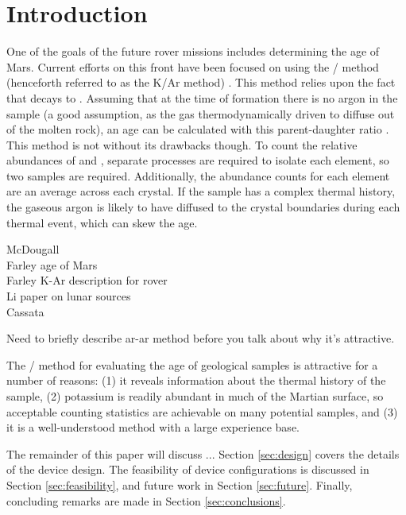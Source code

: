 \documentclass{mc2015}
\begin{document}
\section{Introduction}

One of the goals of the future rover missions includes determining the age of Mars. Current efforts on this front have been focused on using the / method (henceforth referred to as the K/Ar method) \cite{farley_situ_2014,farley_double-spike_2013,cassata_situ_2014}. This method relies upon the fact that  decays to . Assuming that at the time of formation there is no argon in the sample (a good assumption, as the gas thermodynamically driven to diffuse out of the molten rock), an age can be calculated with this parent-daughter ratio \cite{mcdougall_geochronology_1999}. This method is not without its drawbacks though. To count the relative abundances of  and , separate processes are required to isolate each element, so two samples are required. Additionally, the abundance counts for each element are an average across each crystal.
 If the sample has a complex thermal history, the gaseous argon is likely to have diffused to the crystal boundaries during each thermal event, which can skew the age.  

McDougall \cite{mcdougall_geochronology_1999}\\
Farley age of Mars \cite{farley_situ_2014}\\
Farley K-Ar description for rover \cite{farley_double-spike_2013}\\
Li paper on lunar sources \cite{li_evaluation_2011}\\
Cassata \cite{cassata_situ_2014}

Need to briefly describe ar-ar  method before you talk about why it's attractive.

The / method for evaluating the age of geological samples is attractive for a number of reasons: (1) it reveals information about the thermal history of the sample, (2) potassium is readily abundant in much of the Martian surface, so acceptable counting statistics are achievable on many potential samples, and (3) it is a well-understood method with a large experience base. 

The remainder of this paper will discuss ... Section \ref{sec:design} covers the details of the device design. The feasibility of device configurations is discussed in Section \ref{sec:feasibility}, and future work in Section \ref{sec:future}. Finally, concluding remarks are made in Section \ref{sec:conclusions}.
\end{document}
